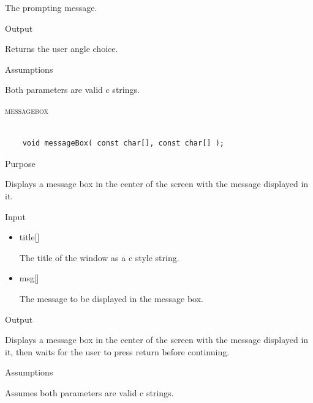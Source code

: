 \documentclass[pdftex, 11pt]{article}
\begin{document}
\begin{description}
\begin{description}
\begin{itemize}
						The prompting message.

				\end{itemize}

			\item{Output}

				Returns the user angle choice.

			\item{Assumptions}

				Both parameters are valid c strings.

		\end{description}


	\item{\textsc{messagebox}}

		\begin{lstlisting}

	void messageBox( const char[], const char[] );
		\end{lstlisting}

		\begin{description}
			\item{Purpose}

				Displays a message box in the center of the screen with
				the message displayed in it.

			\item{Input}

				\begin{itemize}
					
					\item{title[]}

						The title of the window as a c style string.

					\item{msg[]}

						The message to be displayed in the message box.

				\end{itemize}


			\item{Output}
				
				Displays a message box in the center of the screen with
				the message displayed in it, then waits for the user to press
				return before continuing.

			\item{Assumptions}

				Assumes both parameters are valid c strings.

		\end{description}




\end{description}
\end{document}
